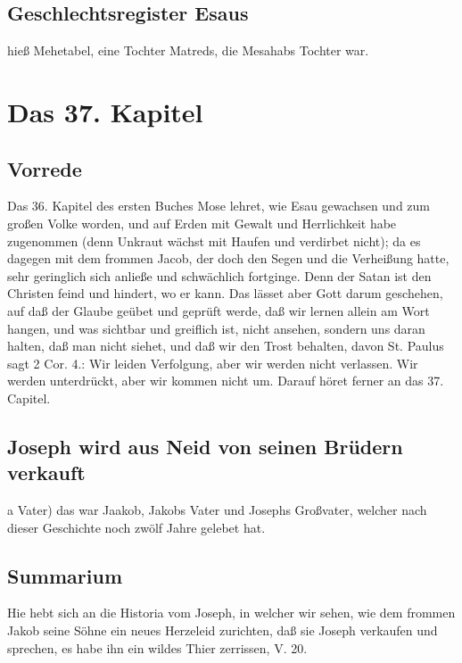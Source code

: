 \section{Geschlechtsregister Esaus}
hieß Mehetabel, eine Tochter Matreds, die Mesahabs Tochter war.

\chapter{Das 37. Kapitel}

\section{Vorrede}

Das 36. Kapitel des ersten Buches Mose lehret, wie Esau gewachsen und zum großen Volke worden, und auf Erden mit Gewalt und Herrlichkeit habe zugenommen (denn Unkraut wächst mit Haufen und verdirbet nicht); da es dagegen mit dem frommen Jacob, der doch den Segen und die Verheißung hatte, sehr geringlich sich anließe und schwächlich fortginge. Denn der Satan ist den Christen feind und hindert, wo er kann. Das lässet aber Gott darum geschehen, auf daß der Glaube geübet und geprüft werde, daß wir lernen allein am Wort hangen, und was sichtbar und greiflich ist, nicht ansehen, sondern uns daran halten, daß man nicht siehet, und daß wir den Trost behalten, davon St. Paulus sagt 2 Cor. 4.: Wir leiden Verfolgung, aber wir werden nicht verlassen. Wir werden unterdrückt, aber wir kommen nicht um. Darauf höret ferner an das 37. Capitel.

\section{Joseph wird aus Neid von seinen Brüdern verkauft}

a Vater) das war Jaakob, Jakobs Vater und Josephs Großvater, welcher nach dieser Geschichte noch zwölf Jahre gelebet hat.

\section{Summarium}

Hie hebt sich an die Historia vom Joseph, in welcher wir sehen, wie dem frommen Jakob seine Söhne ein neues Herzeleid zurichten, daß sie Joseph verkaufen und sprechen, es habe ihn ein wildes Thier zerrissen, V. 20.

